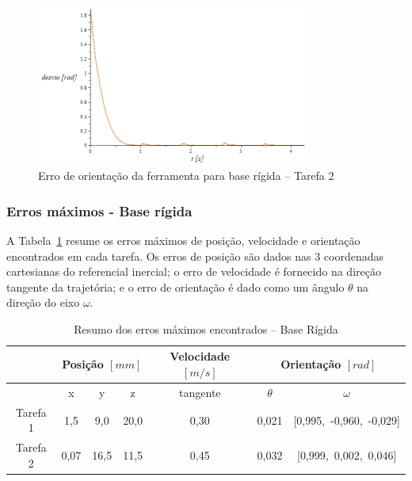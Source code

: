 \begin{figure}[h!]
	\centering 
 	\includegraphics[width=0.80\textwidth]{figs/t2_erroori_base_rig}
 	\caption{Erro de orientação da ferramenta para base rígida -- Tarefa
 	2}
 	\label{fig::t2_erroori_base_rig}
\end{figure}

\subsubsection{Erros máximos - Base rígida}

A Tabela~\ref{tab::erros_base_rig} resume os erros máximos de posição,
velocidade e orientação encontrados em cada tarefa. Os erros de posição
são dados nas 3 coordenadas cartesianas do referencial inercial; o erro
de velocidade é fornecido na direção tangente da trajetória; e o erro de
orientação é dado como um ângulo $\theta$ na direção do eixo $\omega$.

\begin{table}[h!]
\centering
\caption{Resumo dos erros máximos encontrados -- Base Rígida}
\label{tab::erros_base_rig}
\begin{tabular}{@{}ccccccc@{}}
\toprule
         & \multicolumn{3}{c}{\textbf{Posição $[mm]$}} & \textbf{Velocidade $[m/s]$} & \multicolumn{2}{c}{\textbf{Orientação $[rad]$}} 	\\ \midrule
         & x          & y          & z          & tangente            & $\theta$            & $\omega$         		\\
Tarefa 1 & 1,5        & 9,0        & 20,0       & 0,30                &	0,021				& [0,995,~-0,960,~-0,029]                  	\\
Tarefa 2 & 0,07       & 16,5	   & 11,5       & 0,45                & 0,032				& [0,999,~0,002,~0,046] \\ \bottomrule
\end{tabular}
\end{table}


